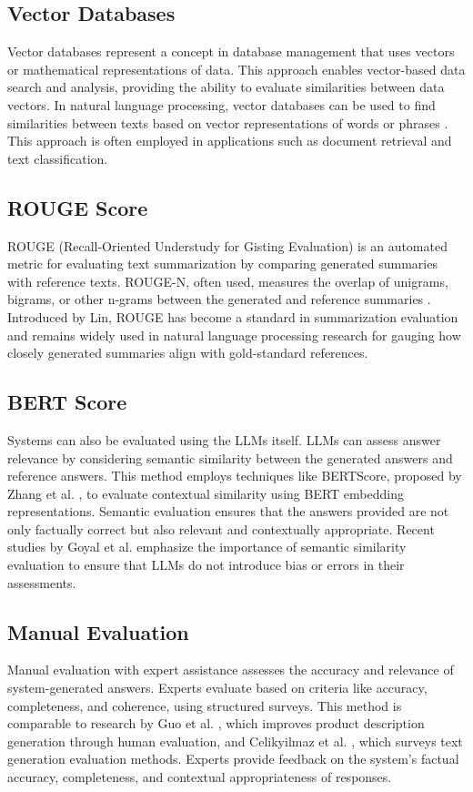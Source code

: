 \documentclass[runningheads]{llncs}
\begin{document}
\subsection{Vector Databases}
Vector databases represent a concept in database management that uses vectors or mathematical representations of data. This approach enables vector-based data search and analysis, providing the ability to evaluate similarities between data vectors. In natural language processing, vector databases can be used to find similarities between texts based on vector representations of words or phrases \cite{Manning2008}. This approach is often employed in applications such as document retrieval and text classification.

\subsection{ROUGE Score}
ROUGE (Recall-Oriented Understudy for Gisting Evaluation) is an automated metric for evaluating text summarization by comparing generated summaries with reference texts. ROUGE-N, often used, measures the overlap of unigrams, bigrams, or other n-grams between the generated and reference summaries \cite{Lin2004}. Introduced by Lin, ROUGE has become a standard in summarization evaluation and remains widely used in natural language processing research for gauging how closely generated summaries align with gold-standard references.

\subsection{BERT Score}
Systems can also be evaluated using the LLMs itself. LLMs can assess answer relevance by considering semantic similarity between the generated answers and reference answers. This method employs techniques like BERTScore, proposed by Zhang et al. \cite{Zhang2020}, to evaluate contextual similarity using BERT embedding representations. Semantic evaluation ensures that the answers provided are not only factually correct but also relevant and contextually appropriate. Recent studies by Goyal et al. \cite{Goyal2020} emphasize the importance of semantic similarity evaluation to ensure that LLMs do not introduce bias or errors in their assessments.

\subsection{Manual Evaluation}
Manual evaluation with expert assistance assesses the accuracy and relevance of system-generated answers. Experts evaluate based on criteria like accuracy, completeness, and coherence, using structured surveys. This method is comparable to research by Guo et al. \cite{Guo2024}, which improves product description generation through human evaluation, and Celikyilmaz et al. \cite{Celikyilmaz2020}, which surveys text generation evaluation methods. Experts provide feedback on the system's factual accuracy, completeness, and contextual appropriateness of responses.
\end{document}
